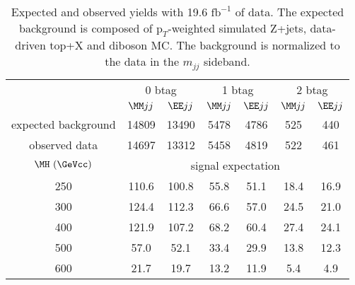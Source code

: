 \begin{table}[h!]
\caption{
Expected and observed yields with 19.6 $\text{fb}^{-1}$ of data.
The expected background is composed of $\text{p}_{T}$-weighted simulated Z+jets, data-driven top+X and diboson MC.
The background is normalized to the data in the $m_{jj}$ sideband.}
\label{tab:seleccion}
\vspace*{\medskipamount}
\centering
\begin{tabular}{|c|c|c|c|c|c|c|} \cline{2-7}
    \multicolumn{1}{c|}{} & \multicolumn{2}{c|}{0 btag} & \multicolumn{2}{c|}{1 btag} & \multicolumn{2}{c|}{2 btag} \\ \cline{2-7}
    \multicolumn{1}{c|}{} & $\MM jj$ & $\EE jj$  &  $\MM jj$ &  $\EE jj$ &  $\MM jj$ &  $\EE jj$ \\ \hline
    expected background  & 14809 & 13490 &  5478 &  4786 &    525 &    440 \\
    observed data        & 14697 & 13312 &  5458 &  4819 &    522 &    461 \\ \hline
    $\MH~(\GeVcc)$ & \multicolumn{6}{c|}{signal expectation}               \\ \hline
            250          & 110.6 & 100.8 &  55.8 &  51.1 &   18.4 &   16.9 \\
            300          & 124.4 & 112.3 &  66.6 &  57.0 &   24.5 &   21.0 \\
            400          & 121.9 & 107.2 &  68.2 &  60.4 &   27.4 &   24.1 \\
            500          &  57.0 &  52.1 &  33.4 &  29.9 &   13.8 &   12.3 \\
            600          &  21.7 &  19.7 &  13.2 &  11.9 &    5.4 &    4.9 \\ \hline
\end{tabular}
\end{table}
